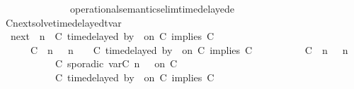 \begin{isabellebody}
\ \ \ \ \ \ \ \ \ \ \ \ \ \ operational{\isacharunderscore}semantics{\isacharunderscore}elim{\isachardot}timedelayed{\isacharunderscore}e{}{\isacharparenright}%
\endisatagproof
{\isafoldproof}%
%
\isadelimproof
\isanewline
%
\endisadelimproof
\isanewline
{}\isamarkupfalse%
\ Cnext{\isacharunderscore}solve{\isacharunderscore}timedelayed{\isacharunderscore}tvar{\isacharcolon}\isanewline
\ \ {\isacartoucheopen}{\isacharparenleft}{\isasymC}\isactrlsub n\isactrlsub e\isactrlsub x\isactrlsub t\ {\isacharparenleft}{\isasymGamma}{\isacharcomma}\ n\ {\isasymturnstile}\ {\isacharparenleft}{\isacharparenleft}C\ time{\isacharminus}delayed{\isasymbowtie}\ by\ {\isasymdelta}{\isasymtau}\ on\ C\ implies\ C\ {\isacharhash}\ {\isasymPsi}{\isacharparenright}\ {\isasymtriangleright}\ {\isasymPhi}{\isacharparenright}{\isacharparenright}\isanewline
\ \ \ \ {\isasymsupseteq}\ {\isacharbraceleft}\ {\isacharparenleft}{\isacharparenleft}C\ {\isasymnot}{\isasymUp}\ n{\isacharparenright}\ {\isacharhash}\ {\isasymGamma}{\isacharparenright}{\isacharcomma}\ n\ {\isasymturnstile}\ {\isasymPsi}\ {\isasymtriangleright}\ {\isacharparenleft}{\isacharparenleft}C\ time{\isacharminus}delayed{\isasymbowtie}\ by\ {\isasymdelta}{\isasymtau}\ on\ C\ implies\ C\ {\isacharhash}\ {\isasymPhi}{\isacharparenright}{\isacharcomma}\isanewline
\ \ \ \ \ \ \ \ {\isacharparenleft}{\isacharparenleft}C\ {\isasymUp}\ n{\isacharparenright}\ {\isacharhash}\ {\isasymGamma}{\isacharparenright}{\isacharcomma}\ n\isanewline
\ \ \ \ \ \ \ \ \ \ {\isasymturnstile}\ {\isacharparenleft}C\ sporadic{\isasymsharp}\ {\isasymlparr}{\isasymtau}\isactrlsub v\isactrlsub a\isactrlsub r{\isacharparenleft}C\ n{\isacharparenright}\ {\isasymoplus}\ {\isasymdelta}{\isasymtau}{\isasymrparr}\ on\ C\ {\isacharhash}\ {\isasymPsi}\isanewline
\ \ \ \ \ \ \ \ \ \ {\isasymtriangleright}\ {\isacharparenleft}{\isacharparenleft}C\ time{\isacharminus}delayed{\isasymbowtie}\ by\ {\isasymdelta}{\isasymtau}\ on\ C\ implies\ C\ {\isacharhash}\ {\isasymPhi}{\isacharparenright}\ {\isacharbraceright}{\isacartoucheclose}\isanewline
%
\isadelimproof
%
\endisadelimproof
%
\isatagproof

\end{isabellebody}
